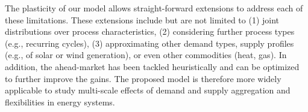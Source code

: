\documentclass[conference]{IEEEtran}
\begin{document}
The plasticity of our model allows straight-forward extensions to address each of these limitations. These extensions include but are not limited to (1) joint distributions over process characteristics, (2) considering further process types (e.g., recurring cycles), (3) approximating other demand types, supply profiles (e.g., of solar or wind generation), or even other commodities (heat, gas). In addition, the ahead-market has been tackled heuristically and can be optimized to further improve the gains. %
The proposed model is therefore more widely applicable to study multi-scale effects of demand and supply aggregation and flexibilities in energy systems.



\balance

\end{document}
